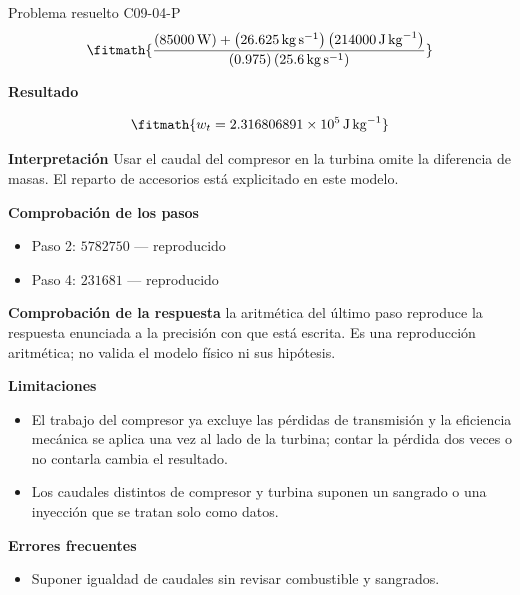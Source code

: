\documentclass[10pt,openany]{book}
\begin{document}
\begin{studiumworked}{Problema resuelto C09-04-P}
\[
\fitmath{\frac{\left(85000\,\mathrm{W}\right) + \left(26.625\,\mathrm{kg}\,\mathrm{s}^{-1}\right) \left(214000\,\mathrm{J}\,\mathrm{kg}^{-1}\right)}{\left(0.975\right) \left(25.6\,\mathrm{kg}\,\mathrm{s}^{-1}\right)}}
\]

\noindent\textbf{Resultado}

\[
\fitmath{w_t=2.316806891\times10^{5}\,\mathrm{J}\,\mathrm{kg}^{-1}}
\]

\noindent\textbf{Interpretación}
Usar el caudal del compresor en la turbina omite la diferencia de masas. El reparto de accesorios está explicitado en este modelo.

\noindent\textbf{Comprobación de los pasos}
\begin{itemize}
\item Paso 2: $5782750$ — reproducido
\item Paso 4: $231681$ — reproducido
\end{itemize}

\noindent\textbf{Comprobación de la respuesta} la aritmética del último paso reproduce la respuesta enunciada a la precisión con que está escrita. Es una reproducción aritmética; no valida el modelo físico ni sus hipótesis.

\noindent\textbf{Limitaciones}
\begin{itemize}
\item El trabajo del compresor ya excluye las pérdidas de transmisión y la eficiencia mecánica se aplica una vez al lado de la turbina; contar la pérdida dos veces o no contarla cambia el resultado.
\item Los caudales distintos de compresor y turbina suponen un sangrado o una inyección que se tratan solo como datos.
\end{itemize}

\noindent\textbf{Errores frecuentes}
\begin{itemize}
\item Suponer igualdad de caudales sin revisar combustible y sangrados.
\end{itemize}
\end{studiumworked}
\end{document}
